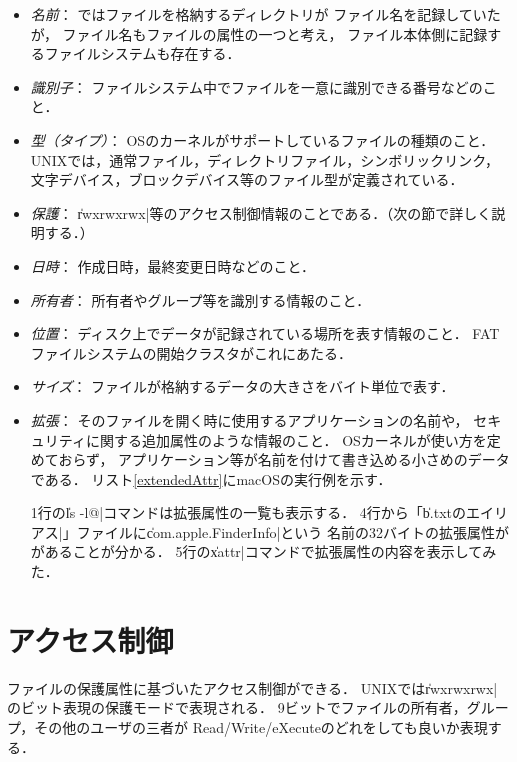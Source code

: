 \begin{itemize}
\item \emph{名前}：
  ではファイルを格納するディレクトリが
  ファイル名を記録していたが，
  ファイル名もファイルの属性の一つと考え，
  ファイル本体側に記録するファイルシステムも存在する．
\item \emph{識別子}：
  ファイルシステム中でファイルを一意に識別できる番号などのこと．
\item \emph{型（タイプ）}：
  OSのカーネルがサポートしているファイルの種類のこと．
  UNIXでは，通常ファイル，ディレクトリファイル，シンボリックリンク，
  文字デバイス，ブロックデバイス等のファイル型が定義されている．
\item \emph{保護}：
  \|rwxrwxrwx|等のアクセス制御情報のことである．（次の節で詳しく説明する．）
\item \emph{日時}：
  作成日時，最終変更日時などのこと．
\item \emph{所有者}：
  所有者やグループ等を識別する情報のこと．
\item \emph{位置}：
  ディスク上でデータが記録されている場所を表す情報のこと．
  FATファイルシステムの開始クラスタがこれにあたる．
\item \emph{サイズ}：
  ファイルが格納するデータの大きさをバイト単位で表す．
\item \emph{拡張}：
  そのファイルを開く時に使用するアプリケーションの名前や，
  セキュリティに関する追加属性のような情報のこと．
  OSカーネルが使い方を定めておらず，
  アプリケーション等が名前を付けて書き込める小さめのデータである．
  リスト\ref{extendedAttr}にmacOSの実行例を示す．

  

  1行の\|ls -l@|コマンドは拡張属性の一覧も表示する．
  4行から「\|b.txtのエイリアス|」ファイルに\|com.apple.FinderInfo|という
  名前の32バイトの拡張属性ががあることが分かる．
  5行の\|xattr|コマンドで拡張属性の内容を表示してみた．
\end{itemize}

\section{アクセス制御}
ファイルの保護属性に基づいたアクセス制御ができる．
UNIXでは\|rwxrwxrwx|のビット表現の保護モードで表現される．
9ビットでファイルの所有者，グループ，その他のユーザの三者が
Read/Write/eXecuteのどれをしても良いか表現する．


